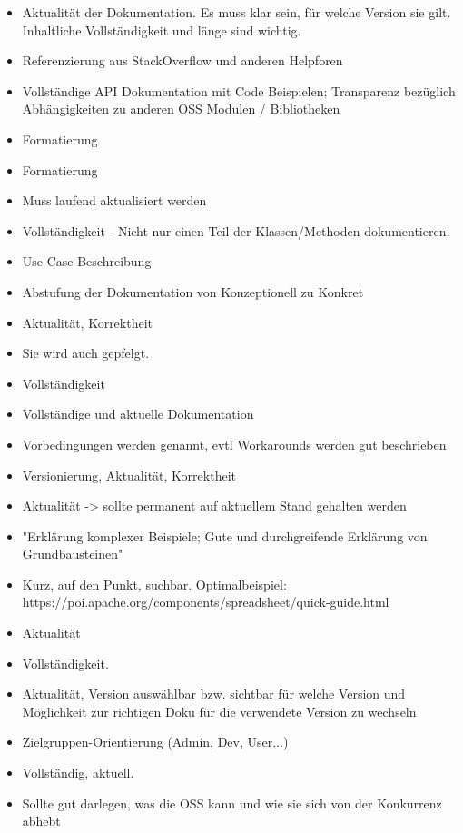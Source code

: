 \begin{multicols}{2}
\begin{itemize}
        \item Aktualität der Dokumentation. Es muss klar sein, für welche Version sie gilt. Inhaltliche Vollständigkeit und länge sind wichtig.
        \item Referenzierung aus StackOverflow und anderen Helpforen
        \item Vollständige API Dokumentation mit Code Beispielen; Transparenz bezüglich Abhängigkeiten zu anderen OSS Modulen / Bibliotheken
        \item Formatierung
        \item Formatierung
        \item Muss laufend aktualisiert werden
        \item Vollständigkeit - Nicht nur einen Teil der Klassen/Methoden dokumentieren.
        \item Use Case Beschreibung
        \item Abstufung der Dokumentation von Konzeptionell zu Konkret
        \item Aktualität, Korrektheit
        \item Sie wird auch gepfelgt.
        \item Vollständigkeit
        \item Vollständige und aktuelle Dokumentation
        \item Vorbedingungen werden genannt, evtl Workarounds werden gut beschrieben
        \item Versionierung, Aktualität, Korrektheit
        \item Aktualität -> sollte permanent auf aktuellem Stand gehalten werden
        \item "Erklärung komplexer Beispiele; Gute und durchgreifende Erklärung von Grundbausteinen"
        \item Kurz, auf den Punkt, suchbar. Optimalbeispiel: https://poi.apache.org/components/spreadsheet/quick-guide.html
        \item Aktualität
        \item Vollständigkeit.
        \item Aktualität, Version auswählbar bzw. sichtbar für welche Version und Möglichkeit zur richtigen Doku für die verwendete Version zu wechseln
        \item Zielgruppen-Orientierung (Admin, Dev, User...)
        \item Vollständig, aktuell.
        \item Sollte gut darlegen, was die OSS kann und wie sie sich von der Konkurrenz abhebt

\end{itemize}
\end{multicols}
